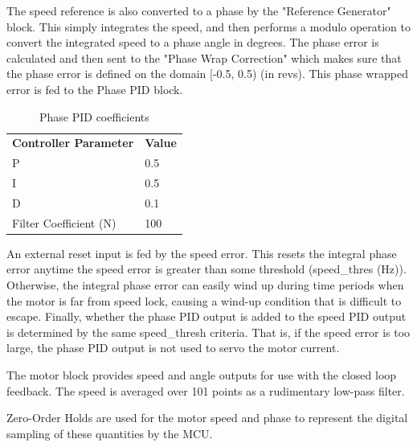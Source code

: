 \documentclass[11pt]{article} %
\begin{document}
The speed reference is also converted to a phase by the "Reference Generator" block. This simply integrates the speed, and then performs a modulo operation to convert the integrated speed to a phase angle in degrees. The phase error is calculated and then sent to the "Phase Wrap Correction" which makes sure that the phase error is defined on the domain [-0.5, 0.5) (in revs). This phase wrapped error is fed to the Phase PID block.

\begin{table}[h]
\centering
\begin{tabular}{l | l }
\textbf{Controller Parameter} & \textbf{Value} \\
P & 0.5 \\
I & 0.5 \\
D & 0.1 \\
Filter Coefficient (N) & 100
\end{tabular}
\caption{Phase PID coefficients}
\label{tab:PhasePIDcoeffs}
\end{table}

\noindent An external reset input is fed by the speed error. This resets the integral phase error anytime the speed error is greater than some threshold (speed\_thres (Hz)). Otherwise, the integral phase error can easily wind up during time periods when the motor is far from speed lock, causing a wind-up condition that is difficult to escape. Finally, whether the phase PID output is added to the speed PID output is determined by the same speed\_thresh criteria. That is, if the speed error is too large, the phase PID output is not used to servo the motor current.

The motor block provides speed and angle outputs for use with the closed loop feedback. The speed is averaged over 101 points as a rudimentary low-pass filter.

Zero-Order Holds are used for the motor speed and phase to represent the digital sampling of these quantities by the MCU.
\end{document}
